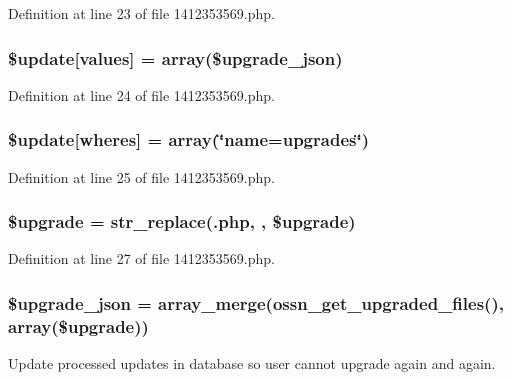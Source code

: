 Definition at line 23 of file 1412353569.\+php.

\subsubsection[{\texorpdfstring{\$update}{$update}}]{\setlength{\rightskip}{0pt plus 5cm}\${\bf update}\mbox{[}\textquotesingle{}values\textquotesingle{}\mbox{]} = array(\$upgrade\+\_\+json)}\hypertarget{1412353569_8php_ac82a75b4c6df37380ff77c88f041785e}{}\label{1412353569_8php_ac82a75b4c6df37380ff77c88f041785e}


Definition at line 24 of file 1412353569.\+php.

\subsubsection[{\texorpdfstring{\$update}{$update}}]{\setlength{\rightskip}{0pt plus 5cm}\${\bf update}\mbox{[}\textquotesingle{}wheres\textquotesingle{}\mbox{]} = array(\char`\"{}name=\textquotesingle{}upgrades\textquotesingle{}\char`\"{})}\hypertarget{1412353569_8php_aacde4479a904b32d0f24dea4e01f148c}{}\label{1412353569_8php_aacde4479a904b32d0f24dea4e01f148c}


Definition at line 25 of file 1412353569.\+php.

\subsubsection[{\texorpdfstring{\$upgrade}{$upgrade}}]{\setlength{\rightskip}{0pt plus 5cm}\$upgrade = str\+\_\+replace(\textquotesingle{}.php\textquotesingle{}, \textquotesingle{}\textquotesingle{}, \$upgrade)}\hypertarget{1412353569_8php_a9084097ce600d3cc7a79a20ecaea9906}{}\label{1412353569_8php_a9084097ce600d3cc7a79a20ecaea9906}


Definition at line 27 of file 1412353569.\+php.

\subsubsection[{\texorpdfstring{\$upgrade\+\_\+json}{$upgrade_json}}]{\setlength{\rightskip}{0pt plus 5cm}\$upgrade\+\_\+json = array\+\_\+merge({\bf ossn\+\_\+get\+\_\+upgraded\+\_\+files}(), array(\$upgrade))}\hypertarget{1412353569_8php_a512525d0f5eb608ac72ca7b85e5fbf65}{}\label{1412353569_8php_a512525d0f5eb608ac72ca7b85e5fbf65}
Update processed updates in database so user cannot upgrade again and again.

